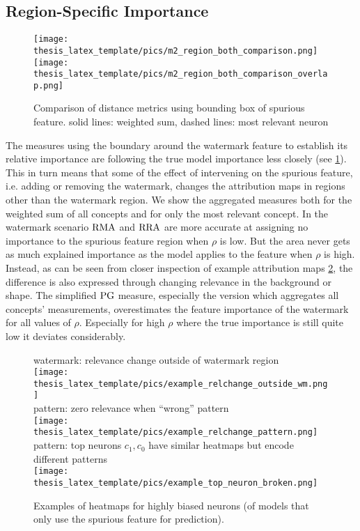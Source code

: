 \subsection{Region-Specific Importance}

\begin{figure}[ht!]
\centering
    \texttt{[image: thesis\_latex\_template/pics/m2\_region\_both\_comparison.png]}
    \texttt{[image: thesis\_latex\_template/pics/m2\_region\_both\_comparison\_overlap.png]}
    \caption[Region Specific, Comparison of Metrics]{Comparison of distance metrics using bounding box of spurious feature. solid lines: weighted sum, dashed lines: most relevant neuron}
    \label{fig:m2_region_comparison}
\end{figure}

The measures using the boundary around the watermark feature to establish its relative importance are following the true model importance less closely (see \cref{fig:m2_region_comparison}). 
This in turn means that some of the effect of intervening on the spurious feature, i.e. adding or removing the watermark, changes the attribution maps in regions other than the watermark region. We show the aggregated measures both for the weighted sum of all concepts and for only the most relevant concept. 
In the watermark scenario $\operatorname*{RMA}$ and $\operatorname*{RRA}$ are more accurate at assigning no importance to the spurious feature region when $\rho$ is low. But the area never gets as much explained importance as the model applies to the feature when $\rho$ is high. Instead, as can be seen from closer inspection of example attribution maps \cref{fig:example_relchange_outside_wm}, the difference is also expressed through changing relevance in the background or shape. 
The simplified $\operatorname*{PG}$ measure, especially the version which aggregates all concepts' measurements, overestimates the feature importance of the watermark for all values of $\rho$. Especially for high $\rho$ where the true importance is still quite low it deviates considerably.

\begin{figure}[t!]
    \centering
    watermark: relevance change outside of watermark region\\
    \texttt{[image: thesis\_latex\_template/pics/example\_relchange\_outside\_wm.png]}\\
    pattern: zero relevance when ``wrong'' pattern\\
    \texttt{[image: thesis\_latex\_template/pics/example\_relchange\_pattern.png]}\\
    pattern: top neurons $c_1, c_0$ have similar heatmaps but encode different patterns\\
    \texttt{[image: thesis\_latex\_template/pics/example\_top\_neuron\_broken.png]}
    \caption{Examples of heatmaps for highly biased neurons (of models that only use the spurious feature for prediction). }
    \label{fig:example_relchange_outside_wm}
\end{figure}

